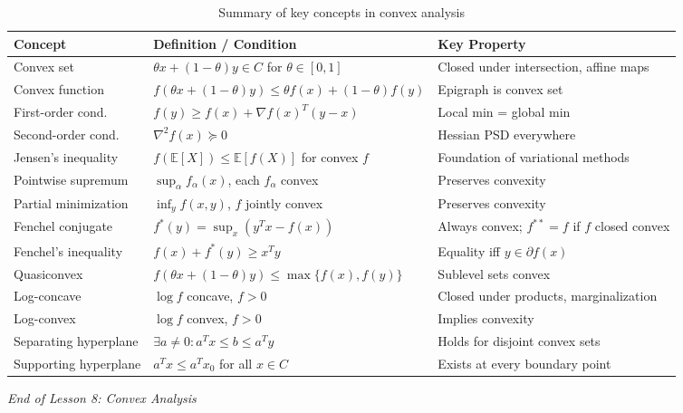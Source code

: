 \documentclass[11pt,a4paper]{article}
\theoremstyle{definition}
\theoremstyle{remark}
\newcommand{\E}{\mathbb{E}}
\begin{document}
\begin{table}[h!]
\centering
\caption{Summary of key concepts in convex analysis}
\label{tab:summary}
\renewcommand{\arraystretch}{1.3}
\begin{tabular}{@{}p{3.5cm}p{5.5cm}p{5cm}@{}}
\toprule
\textbf{Concept} & \textbf{Definition / Condition} & \textbf{Key Property} \\
\midrule
Convex set &
$\theta x + (1-\theta)y \in C$ for $\theta \in [0,1]$ &
Closed under intersection, affine maps \\

Convex function &
$f(\theta x + (1-\theta)y) \le \theta f(x) + (1-\theta) f(y)$ &
Epigraph is convex set \\

First-order cond. &
$f(y) \ge f(x) + \nabla f(x)^T(y-x)$ &
Local min = global min \\

Second-order cond. &
$\nabla^2 f(x) \succeq 0$ &
Hessian PSD everywhere \\

Jensen's inequality &
$f(\E[X]) \le \E[f(X)]$ for convex $f$ &
Foundation of variational methods \\

Pointwise supremum &
$\sup_\alpha f_\alpha(x)$, each $f_\alpha$ convex &
Preserves convexity \\

Partial minimization &
$\inf_y f(x,y)$, $f$ jointly convex &
Preserves convexity \\

Fenchel conjugate &
$f^*(y) = \sup_x (y^T x - f(x))$ &
Always convex; $f^{**} = f$ if $f$ closed convex \\

Fenchel's inequality &
$f(x) + f^*(y) \ge x^T y$ &
Equality iff $y \in \partial f(x)$ \\

Quasiconvex &
$f(\theta x + (1-\theta)y) \le \max\{f(x), f(y)\}$ &
Sublevel sets convex \\

Log-concave &
$\log f$ concave, $f > 0$ &
Closed under products, marginalization \\

Log-convex &
$\log f$ convex, $f > 0$ &
Implies convexity \\

Separating hyperplane &
$\exists a \ne 0: a^T x \le b \le a^T y$ &
Holds for disjoint convex sets \\

Supporting hyperplane &
$a^T x \le a^T x_0$ for all $x \in C$ &
Exists at every boundary point \\
\bottomrule
\end{tabular}
\end{table}

\vspace{1cm}

\begin{center}
  \textit{End of Lesson 8: Convex Analysis}
\end{center}
\end{document}

